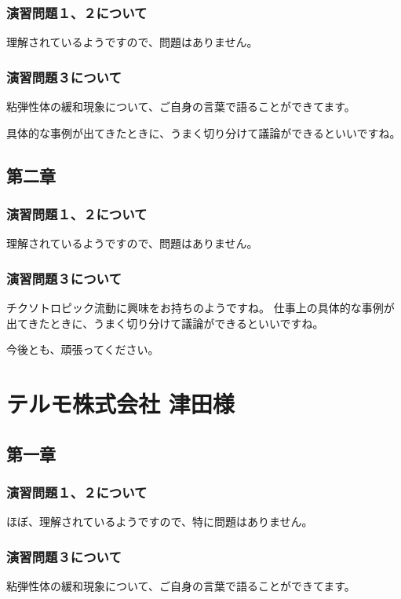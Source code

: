 \documentclass[uplatex,dvipdfmx,a4paper,11pt]{jsreport}
\begin{document}
\subsubsection*{演習問題１、２について}
理解されているようですので、問題はありません。

\subsubsection*{演習問題３について}
粘弾性体の緩和現象について、ご自身の言葉で語ることができてます。

具体的な事例が出てきたときに、うまく切り分けて議論ができるといいですね。

\subsection*{第二章}
\subsubsection*{演習問題１、２について}
理解されているようですので、問題はありません。

\subsubsection*{演習問題３について}

チクソトロピック流動に興味をお持ちのようですね。
仕事上の具体的な事例が出てきたときに、うまく切り分けて議論ができるといいですね。

今後とも、頑張ってください。

\clearpage

\section*{テルモ株式会社 津田様}
\subsection*{第一章}
\subsubsection*{演習問題１、２について}
ほぼ、理解されているようですので、特に問題はありません。

\subsubsection*{演習問題３について}
粘弾性体の緩和現象について、ご自身の言葉で語ることができてます。
\end{document}
